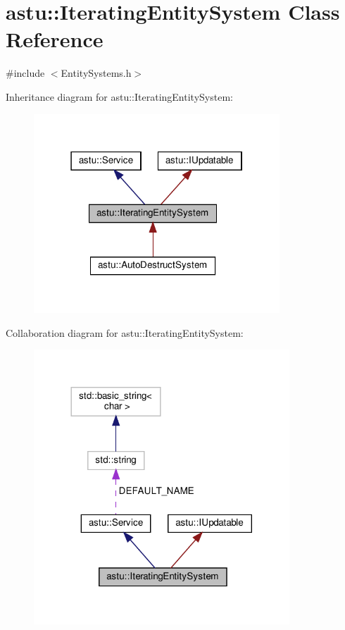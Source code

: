 \hypertarget{classastu_1_1IteratingEntitySystem}{}\section{astu\+:\+:Iterating\+Entity\+System Class Reference}
\label{classastu_1_1IteratingEntitySystem}


{\ttfamily \#include $<$Entity\+Systems.\+h$>$}



Inheritance diagram for astu\+:\+:Iterating\+Entity\+System\+:
\nopagebreak
\begin{figure}[H]
\begin{center}
\leavevmode
\includegraphics[width=262pt]{classastu_1_1IteratingEntitySystem__inherit__graph}
\end{center}
\end{figure}


Collaboration diagram for astu\+:\+:Iterating\+Entity\+System\+:
\nopagebreak
\begin{figure}[H]
\begin{center}
\leavevmode
\includegraphics[width=272pt]{classastu_1_1IteratingEntitySystem__coll__graph}
\end{center}
\end{figure}
